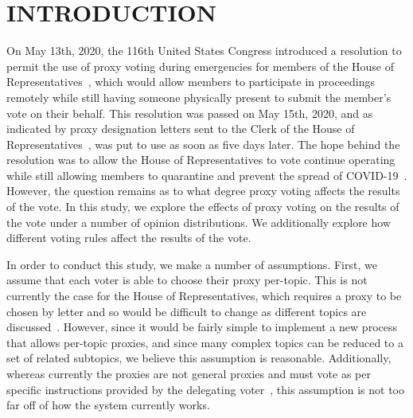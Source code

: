 %
%

\chapter{INTRODUCTION}\label{ch:introduction}
\thispagestyle{empty}

On May 13th, 2020, the 116th United States Congress introduced a resolution
to permit the use of proxy voting during emergencies for members of the House of
Representatives~\cite{Congress.gov2020}, which would allow members to participate in
proceedings remotely while still having someone physically present to submit the
member's vote on their behalf.
This resolution was passed on May 15th, 2020, and as indicated by proxy designation
letters sent to the Clerk of the House of Representatives~\cite{Clerk.House.gov2022},
was put to use as soon as five days later.
The hope behind the resolution was to allow the House of Representatives
to vote continue operating while still allowing members to quarantine and
prevent the spread of COVID-19~\cite{Congress.gov2020}.
However, the question remains as to what degree proxy voting affects the results of
the vote.
In this study, we explore the effects of proxy voting on the results of the vote
under a number of opinion distributions.
We additionally explore how different voting rules affect the results of the vote.


In order to conduct this study, we make a number of assumptions.
First, we assume that each voter is able to choose their proxy per-topic.
This is not currently the case for the House of Representatives, which requires
a proxy to be chosen by letter and so would be difficult to change as different
topics are discussed~\cite{Congress.gov2020}.
However, since it would be fairly simple to implement a new process that allows
per-topic proxies, and since many complex topics can be reduced to a set of related
subtopics, we believe this assumption is reasonable.
Additionally, whereas currently the proxies are not general proxies and must vote as
per specific instructions provided by the delegating
voter~\cite{CERP2020, Congress.gov2020}, this assumption is not too far off of how
the system currently works.

